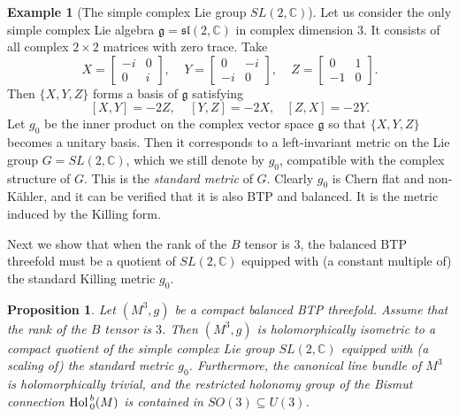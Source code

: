 \documentclass{amsart}
\numberwithin{equation}{section}
\newtheorem{proposition}[theorem]{Proposition}
\theoremstyle{definition}
\newtheorem{example}  [theorem]     {Example}
\renewcommand{\1}{\mathds{1}}
\renewcommand{\>}{\rightarrow}
\begin{document}
\begin{example}[The simple complex Lie group $SL(2,{\mathbb C})$] \label{exampleSL2C}
 Let us consider the only simple complex Lie algebra ${\mathfrak g}={\mathfrak s}{\mathfrak l}(2,{\mathbb C})$ in complex dimension $3$. It consists of all complex $2\times 2$ matrices with zero trace. Take
\begin{equation*}
X = \left[ \begin{array}{cc} -i & 0 \\ 0 & i \end{array} \right] , \ \ \ \ \ Y = \left[ \begin{array}{cc} 0 & -i \\ -i & 0 \end{array} \right] , \ \ \ \ \ Z= \left[ \begin{array}{cc} 0 & 1 \\ -1 & 0 \end{array} \right] .
\end{equation*}
Then $\{ X, Y, Z\}$ forms a  basis of ${\mathfrak g}$ satisfying
\begin{equation} \label{sl2C}
[X, Y] =-2Z, \ \ \ \ \ [Y,Z]=-2X, \ \ \ \  [Z,X]=-2Y.
\end{equation}
Let $g_0$ be the inner product on the complex vector space ${\mathfrak g}$ so that $\{ X, Y, Z\}$ becomes a unitary basis. Then it corresponds to a left-invariant metric on the Lie group $G=SL(2,{\mathbb C})$, which we still denote by $g_0$, compatible with the complex structure of $G$. This is the {\em standard metric} of $G$. Clearly $g_0$ is Chern flat and non-K\"ahler, and it can be verified that it is also BTP and balanced. It is the metric induced by the Killing form.
\end{example}

Next we show that when the rank of the  $B$ tensor is $3$, the balanced BTP threefold must be a quotient of $SL(2,{\mathbb C})$ equipped with (a constant multiple of) the standard Killing metric $g_0$.



\begin{proposition}
Let $(M^3,g)$ be a compact balanced BTP threefold. Assume that the rank of the $B$ tensor is $3$. Then $(M^3,g)$ is holomorphically isometric to a compact quotient of the simple complex Lie group $SL(2,{\mathbb C})$ equipped with (a scaling of) the standard metric $g_0$. Furthermore, the canonical line bundle of $M^3$ is holomorphically trivial, and the restricted holonomy group of the Bismut connection $\mbox{Hol\,}_0^{b}(M)$ is contained in $ SO(3)\subseteq U(3)$.
\end{proposition}
\end{document}
